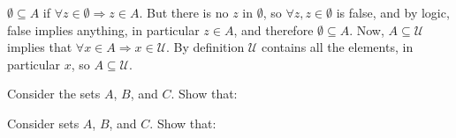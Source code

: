 \documentclass[answers]{exam}
\begin{document}
\begin{questions}
\begin{parts}
\begin{solution}
    $\emptyset\subseteq A$ if $\forall z\in \emptyset \Rightarrow z\in A$. But there is no $z$ in $\emptyset$, so $\forall z, z\in \emptyset$ is false, and by logic, false implies anything, in particular $z\in A$, and therefore $\emptyset\subseteq A$.
    Now, $A\subseteq \mathcal{U}$ implies that $\forall x\in A\Rightarrow x\in\mathcal{U}$. By definition $\mathcal{U}$ contains all the elements, in particular $x$, so $A\subseteq\mathcal{U}$.
\end{solution}

\end{parts}

\question Consider the sets $A$, $B$, and $C$. Show that:


\question Consider sets $A$, $B$, and $C$. Show that:



\end{questions}
\end{document}

